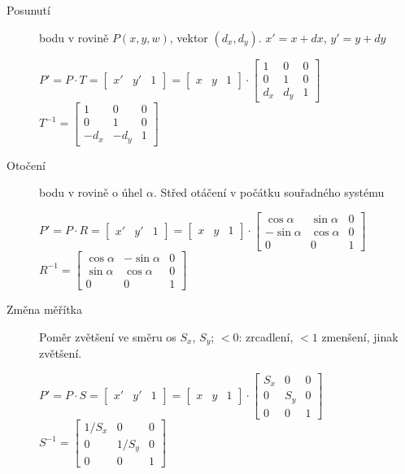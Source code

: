 \documentclass[a4paper, 11pt]{report}
\begin{document}
\begin{description}
	\item[Posunutí] bodu v rovině $P(x,y,w)$, vektor $(d_x, d_y)$. $x' = x + dx$, $y' = y + dy$
	
	$P' = P \cdot T = \begin{bmatrix} x' & y' & 1 \end{bmatrix} = \begin{bmatrix} x & y & 1 \end{bmatrix}
	\cdot \begin{bmatrix}
		1 & 0 & 0 \\
		0 & 1 & 0 \\
		d_x & d_y & 1
	\end{bmatrix}$
	\hfill
	$T^{-1} = \begin{bmatrix}
		1 & 0 & 0 \\
		0 & 1 & 0 \\
		-d_x & -d_y & 1
	\end{bmatrix}$
	
	\item[Otočení] bodu v rovině o úhel $\alpha$. Střed otáčení v počátku souřadného systému
	
	$P' = P \cdot R = \begin{bmatrix} x' & y' & 1 \end{bmatrix} = \begin{bmatrix} x & y & 1 \end{bmatrix}
	\cdot \begin{bmatrix}
		\cos{\alpha} & \sin{\alpha} & 0 \\
		-\sin{\alpha} & \cos{\alpha} & 0 \\
		0 & 0 & 1
	\end{bmatrix}$
	\hfill
	$R^{-1} = \begin{bmatrix}
		\cos{\alpha} & -\sin{\alpha} & 0 \\
		\sin{\alpha} & \cos{\alpha} & 0 \\
		0 & 0 & 1
	\end{bmatrix}$
	
	\item[Změna měřítka] Poměr zvětšení ve směru os $S_x$, $S_y$; $< 0$: zrcadlení, $< 1$ zmenšení, jinak zvětšení.
	
	$P' = P \cdot S = \begin{bmatrix} x' & y' & 1 \end{bmatrix} = \begin{bmatrix} x & y & 1 \end{bmatrix}
	\cdot \begin{bmatrix}
		S_x & 0 & 0 \\
		0 & S_y & 0 \\
		0 & 0 & 1
	\end{bmatrix}$
	\hfill
	$S^{-1} = \begin{bmatrix}
		1/S_x & 0 & 0 \\
		0 & 1/S_y & 0 \\
		0 & 0 & 1
	\end{bmatrix}$
	

\end{description}
\end{document}
